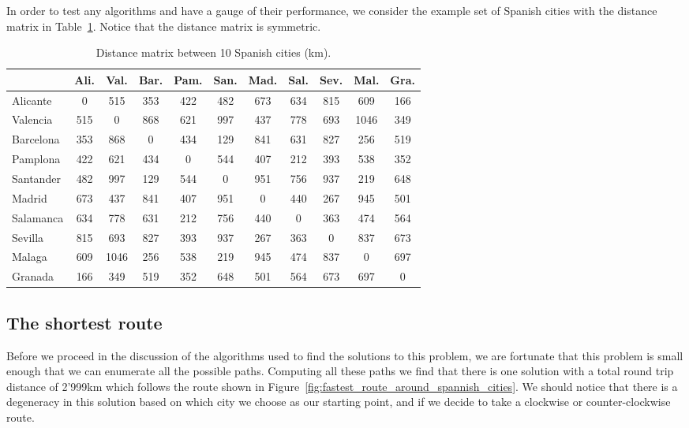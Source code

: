 \documentclass[a4paper, 11pt]{article}
\begin{document}
In order to test any algorithms and have a gauge of their performance, we consider the example set of Spanish cities with the  distance matrix in Table~\ref{tab:distance_matrix}. Notice that the distance matrix is symmetric. 

\begin{table}[hbt]
\begin{center}
\begin{tabular}{|l|cccccccccc|}
\cline{2-11}
\multicolumn{1}{c|}{} & Ali.   & Val.  & Bar. & Pam. & San. & Mad. & Sal. & Sev. & Mal.  & Gra. \\
\hline 
Alicante	& 0   & 515  & 353 & 422 & 482 & 673 & 634 & 815 & 609  & 166 \\
Valencia    & 515 & 0    & 868 & 621 & 997 & 437 & 778 & 693 & 1046 & 349 \\
Barcelona	& 353 & 868  & 0   & 434 & 129 & 841 & 631 & 827 & 256  & 519 \\
Pamplona	& 422 & 621  & 434 & 0   & 544 & 407 & 212 & 393 & 538  & 352 \\
Santander	& 482 & 997  & 129 & 544 & 0   & 951 & 756 & 937 & 219  & 648 \\
Madrid		& 673 & 437  & 841 & 407 & 951 & 0   & 440 & 267 & 945  & 501 \\
Salamanca	& 634 & 778  & 631 & 212 & 756 & 440 & 0   & 363 & 474  & 564 \\
Sevilla		& 815 & 693  & 827 & 393 & 937 & 267 & 363 & 0   & 837  & 673 \\
Malaga		& 609 & 1046 & 256 & 538 & 219 & 945 & 474 & 837 & 0    & 697 \\
Granada		& 166 & 349  & 519 & 352 & 648 & 501 & 564 & 673 & 697  & 0   \\
\hline 
\end{tabular}
\caption{Distance matrix between 10 Spanish cities (km).}
\label{tab:distance_matrix}
\end{center}
\end{table}

\subsection{The shortest route}
\label{subsec:the_shortest_route}

Before we proceed in the discussion of the algorithms used to find the solutions to this problem, we are fortunate that this problem is small enough that we can enumerate all the possible paths. Computing all these paths we find that there is one solution with a total round trip distance of 2'999\:km which follows the route shown in Figure~\ref{fig:fastest_route_around_spannish_cities}. We should notice that there is a degeneracy in this solution based on which city we choose as our starting point, and if we decide to take a clockwise or counter-clockwise route. 
\end{document}

